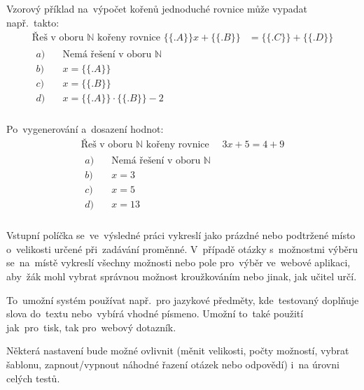 \documentclass[11pt,a4paper]{report}
\begin{document}
            Vzorový příklad na~výpočet kořenů jednoduché rovnice může vypadat např.~takto:
            \begin{align*}
                \text{Řeš v~oboru $\mathbb{N}$ kořeny rovnice } \{\{.A\}\}x + \{\{.B\}\} &= \{\{.C\}\} + \{\{.D\}\} \\
                \begin{aligned}
                    a) \quad &\text{Nemá řešení v oboru $\mathbb{N}$}\\
                    b) \quad &x = \{\{.A\}\} \\
                    c) \quad &x = \{\{.B\}\} \\
                    d) \quad &x = \{\{.A\}\} \cdot \{\{.B\}\} - 2 \\
                \end{aligned}
            \end{align*}

            Po~vygenerování a~dosazení hodnot:
            \begin{align*}
                \text{Řeš v~oboru $\mathbb{N}$ kořeny rovnice } \quad 3x + 5 = 4 + 9 \\
                \begin{aligned}
                    a) \quad &\text{Nemá řešení v oboru }\mathbb{N} \\
                    b) \quad &x = 3 \\
                    c) \quad &x = 5 \\
                    d) \quad &x = 13 \\
                \end{aligned}
            \end{align*}

            Vstupní políčka se~ve~výsledné práci vykreslí jako prázdné nebo podtržené místo o~velikosti určené při~zadávání proměnné. V~případě otázky s~možnostmi výběru se~na~místě vykreslí všechny možnosti nebo pole pro~výběr ve~webové aplikaci, aby~žák mohl vybrat správnou možnost kroužkováním nebo jinak, jak učitel určí.
            
            To~umožní systém používat např.~pro jazykové předměty, kde~testovaný doplňuje slova do~textu nebo~vybírá vhodné písmeno. Umožní to~také použití jak~pro~tisk, tak pro~webový dotazník.

            Některá nastavení bude možné ovlivnit (měnit velikosti, počty možností, vybrat šablonu, zapnout/vypnout náhodné řazení otázek nebo odpovědí) i~na úrovni celých testů.
\end{document}

